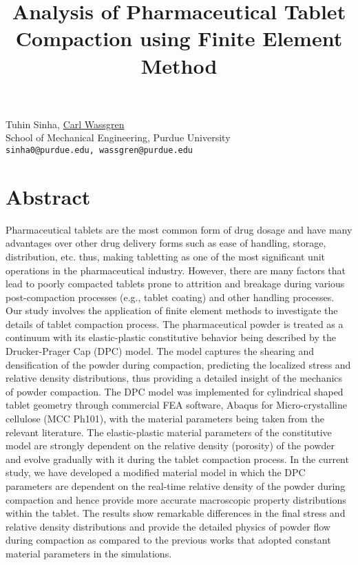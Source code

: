 \title{Analysis of Pharmaceutical Tablet Compaction using Finite Element Method}
\author{} \institute{}
\maketitle

\begin{center}

{\large Tuhin Sinha, \underline{Carl Wassgren}}\\
School of Mechanical Engineering, Purdue University\\
{\tt sinha0@purdue.edu, wassgren@purdue.edu}
\end{center}

\section*{Abstract}
Pharmaceutical tablets are the most common form of drug dosage and have many advantages over other drug delivery forms such as ease of handling, storage, distribution, etc. thus, making tabletting as one of the most significant unit operations in the pharmaceutical industry. However, there are many factors that lead to poorly compacted tablets prone to attrition and breakage during various post-compaction processes (e.g., tablet coating) and other handling processes. Our study involves the application of finite element methods to investigate the details of tablet compaction process. The pharmaceutical powder is treated as a continuum with its elastic-plastic constitutive behavior being described by the Drucker-Prager Cap (DPC) model. The model captures the shearing and densification of the powder during compaction, predicting the localized stress and relative density distributions, thus providing a detailed insight of the mechanics of powder compaction. The DPC model was implemented for cylindrical shaped tablet geometry through commercial FEA software, Abaqus for Micro-crystalline cellulose (MCC Ph101), with the material parameters being taken from the relevant literature. The elastic-plastic material parameters of the constitutive model are strongly dependent on the relative density (porosity) of the powder and evolve gradually with it during the tablet compaction process. In the current study, we have developed a modified material model in which the DPC parameters are dependent on the real-time relative density of the powder during compaction and hence provide more accurate macroscopic property distributions within the tablet. The results show remarkable differences in the final stress and relative density distributions and provide the detailed physics of powder flow during compaction as compared to the previous works that adopted constant material parameters in the simulations.